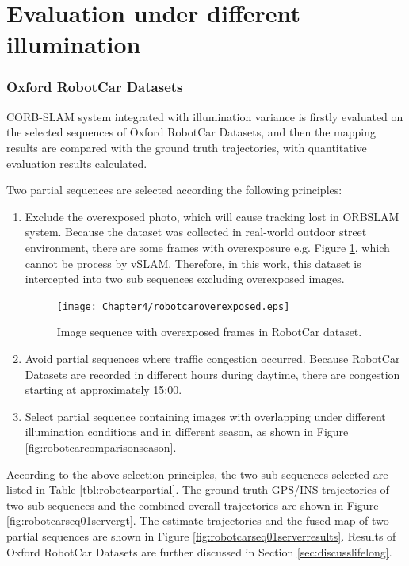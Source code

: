 \section{Evaluation under different illumination}
\subsubsection{Oxford RobotCar Datasets}
CORB-SLAM system integrated with illumination variance is firstly evaluated on the selected sequences of Oxford RobotCar Datasets, and then the mapping results are compared with the ground truth trajectories, with quantitative evaluation results calculated.

Two partial sequences are selected according the following principles: 
\begin{enumerate}[1.]
	\item Exclude the overexposed photo, which will cause tracking lost in ORBSLAM system.
	Because the dataset was collected in real-world outdoor street environment, there are some frames with overexposure e.g. Figure \ref{fig:robotcaroverexposed}, which cannot be process by vSLAM. Therefore, in this work, this dataset is intercepted into two sub sequences excluding overexposed images.

	\begin{figure}[H]
		\centering
		\texttt{[image: Chapter4/robotcaroverexposed.eps]}
		\caption{Image sequence with overexposed frames in RobotCar dataset.}
		\label{fig:robotcaroverexposed} 
	\end{figure}

	\item Avoid partial sequences where traffic congestion occurred. Because RobotCar Datasets are recorded in different hours during daytime, there are congestion starting at approximately 15:00.
	

	\item Select partial sequence containing images with overlapping under different illumination conditions and in different season, as shown in Figure \ref{fig:robotcarcomparisonseason}. 
\end{enumerate}

According to the above selection principles, the two sub sequences selected are listed in Table \ref{tbl:robotcarpartial}. The ground truth GPS/INS trajectories of two sub sequences and the combined overall trajectories are shown in Figure \ref{fig:robotcarseq01servergt}. The estimate trajectories and the fused map of two partial sequences are shown in Figure \ref{fig:robotcarseq01serverresults}. Results of Oxford RobotCar Datasets are further discussed in Section \ref{sec:discusslifelong}.

